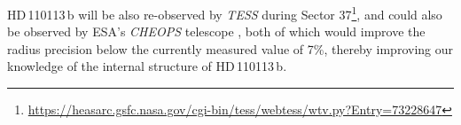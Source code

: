 \documentclass[fleqn,usenatbib]{mnras}
\newcommand{\tess}{{\it TESS}}
\newcommand{\kms}{km\,s$^{-1}$}
\newcommand{\masy}{mas\,yr$^{-1}$}
\newcommand{\mpl}{\mbox{$M_{p}$}}
\newcommand{\rpl}{\mbox{$R_{p}$}}
\newcommand{\mjup}{\mbox{$M_{\rm Jup}$}}
\newcommand{\rjup}{\mbox{$R_{\rm Jup}$}}
\newcommand{\Tstarra}{$12^{\rm h}40^{'}08.78^{"}$}
\newcommand{\Tstardec}{$-44^{\circ}18^{'}43.48^{"}$}
\newcommand{\TGAIAGmag}{$9.9103 \pm 0.0004$}
\newcommand{\TGAIAPMRA}{$-3.72 \pm 0.097$}
\newcommand{\TGAIAPMDec}{$-13.68 \pm 0.12$}
\newcommand{\TGAIAplx}{$9.38 \pm 0.06$}
\newcommand{\TESSTmag}{$9.4628 \pm 0.006$}
\newcommand{\APASSBmag}{$10.675 \pm 0.024$}
\newcommand{\APASSVmag}{$10.09 \pm 0.03$}
\newcommand{\MASSJ}{$8.903 \pm 0.037 $ }
\newcommand{\MASSH}{$8.594 \pm 0.063$ }
\newcommand{\MASSK}{$8.502 \pm 0.024$ }
\newcommand{\Ttzerozero}{ $ 1570.101^{+0.004}_{-0.005} $ }
\newcommand{\Tb}{ $ 0.31 \pm 0.22 $ }
\newcommand{\Tplanet}{HD\,110113\,b}
\newcommand{\TGAIAid}{6133384959942131968}
\newcommand{\TICstar}{TIC-73228647}
\begin{document}
\Tplanet{} will be also re-observed by \tess{} during Sector 37\footnote{\url{https://heasarc.gsfc.nasa.gov/cgi-bin/tess/webtess/wtv.py?Entry=73228647}}, and could also be observed by ESA's \textit{CHEOPS} telescope \citep{benz2020cheops}, both of which would improve the radius precision below the currently measured value of 7\%, thereby improving our knowledge of the internal structure of \Tplanet{}.

%
\end{document}
